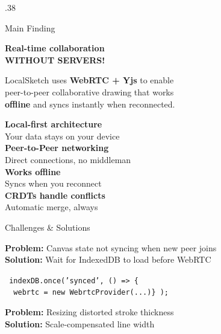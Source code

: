 \documentclass[final,t]{beamer}
\begin{document}
\begin{frame}[t]
\begin{columns}[t]
\begin{column}{.38\linewidth}

\begin{block}{\LARGE Main Finding}
\begin{center}
\vspace{1cm}
{\Huge \textbf{Real-time collaboration}}\\[0.5cm]
{\Huge \textbf{WITHOUT SERVERS!}}

\vspace{1cm}
{\LARGE LocalSketch uses \textbf{WebRTC + Yjs} to enable}\\
{\LARGE peer-to-peer collaborative drawing that works}\\
{\LARGE \textbf{offline} and syncs instantly when reconnected.}

\vspace{1cm}
\colorbox{primary!20}{
\parbox{0.9\linewidth}{
\centering
\Large
\textbf{Local-first architecture}\\[0.3cm]
Your data stays on your device\\[0.5cm]
\textbf{Peer-to-Peer networking}\\[0.3cm]
Direct connections, no middleman\\[0.5cm]
\textbf{Works offline}\\[0.3cm]
Syncs when you reconnect\\[0.5cm]
\textbf{CRDTs handle conflicts}\\[0.3cm]
Automatic merge, always
}
}
\vspace{1cm}
\end{center}
\end{block}

\vspace{0.5cm}

\begin{block}{Challenges \& Solutions}
\colorbox{blue!10}{
\parbox{0.95\linewidth}{
\textbf{Problem:} Canvas state not syncing when new peer joins\\
\textbf{Solution:} Wait for IndexedDB to load before WebRTC

\vspace{0.2cm}
\texttt{\small
indexDB.once('synced', () => \{\\
~~webrtc = new WebrtcProvider(...)\}
);
}
}
}

\vspace{0.5cm}
\colorbox{blue!10}{
\parbox{0.95\linewidth}{
\textbf{Problem:} Resizing distorted stroke thickness\\
\textbf{Solution:} Scale-compensated line width

}}
\end{block}
\end{column}
\end{columns}
\end{frame}
\end{document}
